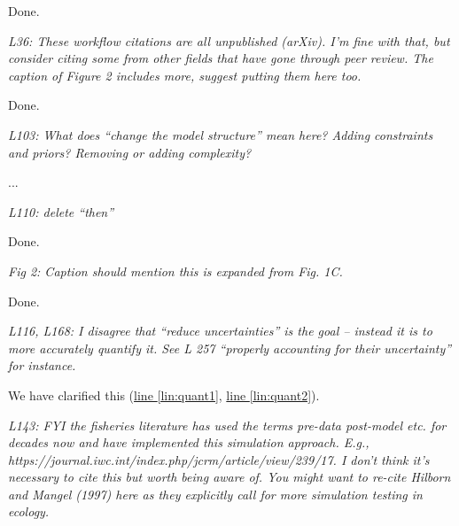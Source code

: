 \documentclass[11pt,letter]{article}
\begin{document}
Done.

\begin{mybox}
\emph{L36: These workflow citations are all unpublished (arXiv). I’m fine with that, but consider citing some from other fields that have gone through peer review. The caption of Figure 2 includes more, suggest putting them here too.}
\end{mybox}

Done.

\begin{mybox}
\emph{L103: What does “change the model structure” mean here? Adding constraints and priors? Removing or adding complexity?}
\end{mybox}

...

\begin{mybox}
\emph{L110: delete “then”}
\end{mybox}

Done. %

\begin{mybox}
\emph{Fig 2: Caption should mention this is expanded from Fig. 1C.}
\end{mybox}

Done.

\begin{mybox}
\emph{L116, L168: I disagree that “reduce uncertainties” is the goal – instead it is to more accurately quantify it. See L 257 “properly accounting for their uncertainty” for instance.}
\end{mybox}

We have clarified this (\href{file:forecastflows_r1\#lintarget:quant1}{line \ref*{lin:quant1}}, \href{file:forecastflows_r1\#lintarget:quant2}{line \ref*{lin:quant2}}).

\begin{mybox}
\emph{L143: FYI the fisheries literature has used the terms pre-data post-model etc. for decades now and have implemented this simulation approach. E.g., https://journal.iwc.int/index.php/jcrm/article/view/239/17. I don’t think it’s necessary to cite this but worth being aware of. You might want to re-cite Hilborn and Mangel (1997) here as they explicitly call for more simulation testing in ecology.}
\end{mybox}
\end{document}
